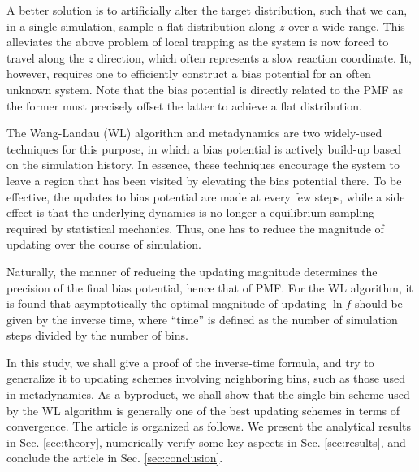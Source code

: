 \documentclass[reprint]{revtex4-1}
\begin{document}
A better solution is to artificially alter
the target distribution,
such that we can, in a single simulation, sample
a flat distribution\cite{mezei1987, berg1992, lee1993,
wang2001, wang2001pre, laio2002}
along $z$ over a wide range.
%
This alleviates the above problem of local trapping
as the system is now forced to travel along the $z$ direction,
which often represents a slow reaction coordinate.
%
It, however, requires one to efficiently construct a
bias potential for an often unknown system.
%
Note that the bias potential is directly related to the PMF
as the former must precisely offset the latter
to achieve a flat distribution.



The Wang-Landau (WL) algorithm\cite{wang2001, wang2001pre}
and metadynamics\cite{laio2002}
are two widely-used techniques for this purpose,
in which a bias potential is actively build-up
based on the simulation history.
%
In essence, these techniques
encourage the system to leave a region that has been visited
by elevating the bias potential there.
%
To be effective, the updates to bias potential
are made at every few steps,
while a side effect is that the underlying dynamics
is no longer a equilibrium sampling
required by statistical mechanics.
%
Thus, one has to reduce the magnitude of updating
over the course of simulation.



Naturally, the manner of reducing
the updating magnitude\cite{
belardinelli2007, belardinelli2007jcp, belardinelli2008,
morozov2007, zhou2008, morozov2009,
komura2012, caparica2012, caparica2014}
determines the precision of the final bias potential,
hence that of PMF.
%
For the WL algorithm, it is found
that asymptotically the optimal magnitude of updating $\ln f$
should be given by the
inverse time\cite{
belardinelli2007, belardinelli2007jcp, belardinelli2008,
morozov2007, zhou2008},
where ``time'' is defined as
the number of simulation steps
divided by the number of bins.


In this study,
we shall give a proof of the inverse-time formula,
and try to generalize it to
updating schemes involving neighboring bins,
such as those used in metadynamics.
%
As a byproduct, we shall show that
the single-bin scheme used by the WL algorithm
is generally one of the best
updating schemes in terms of convergence.
%
The article is organized as follows.
%
We present the analytical results in Sec. \ref{sec:theory},
numerically verify some key aspects
in Sec. \ref{sec:results},
and conclude the article
in Sec. \ref{sec:conclusion}.
\end{document}
